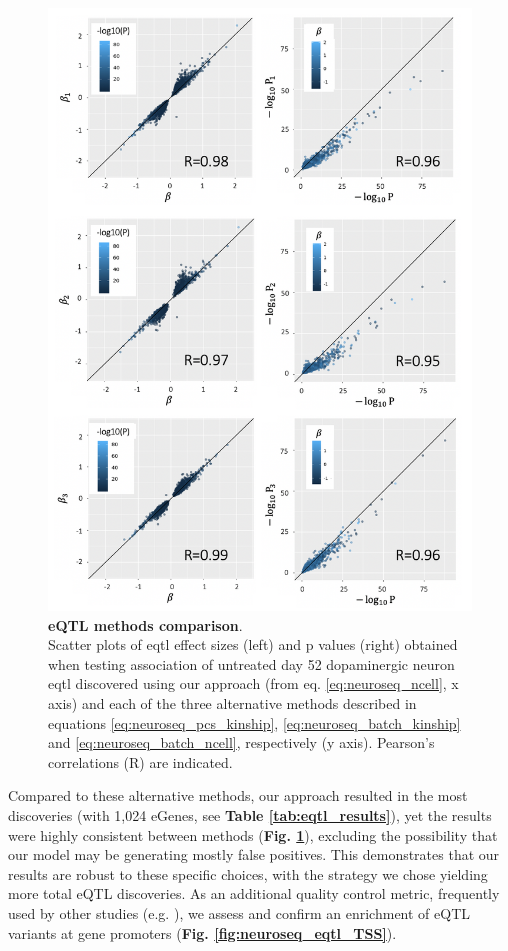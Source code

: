 \begin{figure}[htbp]
\centering
\includegraphics[width=13.5cm]{Chapter5/Fig/neuroseq_eqtl_methods_corr.png}
\caption[eQTL methods comparison]{\textbf{eQTL methods comparison}.\\
Scatter plots of \gls{eqtl} effect sizes (left) and p values (right) obtained when testing association of untreated day 52 dopaminergic neuron \gls{eqtl} discovered using our approach (from eq. \eqref{eq:neuroseq_ncell}, x axis) and each of the three alternative methods described in equations \eqref{eq:neuroseq_pcs_kinship}, \eqref{eq:neuroseq_batch_kinship} and \eqref{eq:neuroseq_batch_ncell}, respectively (y axis). 
Pearson's correlations (R) are indicated.}
\label{fig:neuroseq_eqtl_methods_comp}
\end{figure}


Compared to these alternative methods, our approach resulted in the most discoveries (with 1,024 eGenes, see \textbf{Table \ref{tab:eqtl_results}}), yet the results were highly consistent between methods (\textbf{Fig. \ref{fig:neuroseq_eqtl_methods_comp}}), excluding the possibility that our model may be generating mostly false positives.
This demonstrates that our results are robust to these specific choices, with the strategy we chose yielding more total eQTL discoveries. 
As an additional quality control metric, frequently used by other studies (e.g. \cite{gtex2015genotype}), we assess and confirm an enrichment of eQTL variants at gene promoters (\textbf{Fig. \ref{fig:neuroseq_eqtl_TSS}}).

